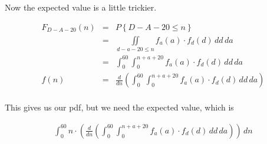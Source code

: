\documentclass[11pt]{article}\usepackage[]{graphicx}\usepackage[]{xcolor}
\begin{document}
\begin{easylist}[enumerate]
    Now the expected value is a little trickier.

    \begin{equation}
        \begin{aligned}
            F_{D - A - 20}(n) &=& P\left\{ D - A - 20 \le n \right\}\\
                              &=& \iint\limits_{d - a - 20 \le n} f_a(a) \cdot f_d(d) \, dd \, da\\
                              &=& \int_0^{60} \int_0^{n + a + 20} f_a(a) \cdot f_d(d) \, dd\,da\\
                         f(n) &=& \frac{d}{dn} \left( \int_0^{60} \int_0^{n + a + 20} f_a(a) \cdot f_d(d) \, dd\,da \right)\\
        \end{aligned}
    \end{equation}

    This gives us our pdf, but we need the expected value, which is

    \begin{equation}
        \begin{aligned}
            \int_0^{60} n \cdot \left(
                 \frac{d}{dn} \left(
                     \int_0^{60} \int_0^{n + a + 20} f_a(a) \cdot f_d(d) \, dd\,da
                 \right)
             \right) \, dn
        \end{aligned}
    \end{equation}

\end{easylist}
\end{document}
